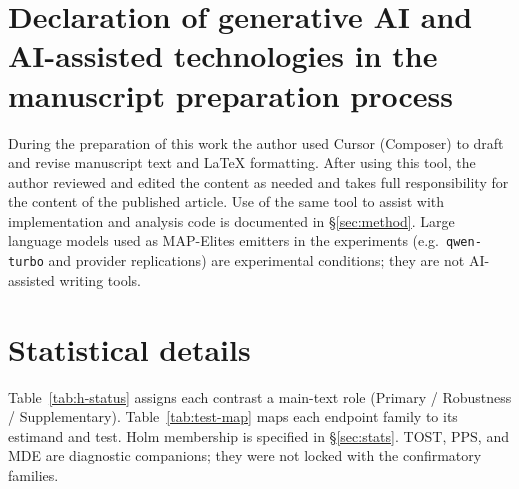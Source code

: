 \documentclass[preprint,12pt]{elsarticle}
\begin{document}
\section*{Declaration of generative AI and AI-assisted technologies in the manuscript preparation process}
During the preparation of this work the author used Cursor (Composer) to draft and revise manuscript text and LaTeX formatting. After using this tool, the author reviewed and edited the content as needed and takes full responsibility for the content of the published article. Use of the same tool to assist with implementation and analysis code is documented in \S\ref{sec:method}. Large language models used as MAP-Elites emitters in the experiments (e.g.\ \texttt{qwen-turbo} and provider replications) are experimental conditions; they are not AI-assisted writing tools.




\clearpage
\appendix
\FloatBarrier
\label{app:start}

\section{Statistical details}
\label{sec:stats-appendix}

Table~\ref{tab:h-status} assigns each contrast a main-text role (Primary / Robustness / Supplementary). Table~\ref{tab:test-map} maps each endpoint family to its estimand and test. Holm membership is specified in \S\ref{sec:stats}. TOST, $\mathrm{PPS}$, and MDE are diagnostic companions; they were not locked with the confirmatory families.
\end{document}
